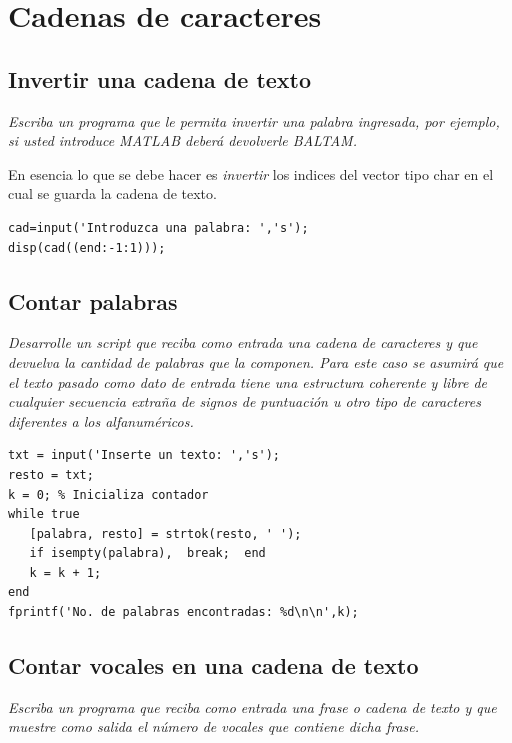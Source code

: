 \chapter{Cadenas de caracteres}

\section{Invertir una cadena de texto}

\textit{Escriba un programa que le permita invertir una palabra ingresada, por ejemplo, si usted 
introduce MATLAB deberá devolverle BALTAM.}



En esencia lo que se debe hacer es \textit{invertir} los indices del vector tipo char en 
el cual se guarda la cadena de texto.

\begin{verbatim}
cad=input('Introduzca una palabra: ','s');
disp(cad((end:-1:1)));
\end{verbatim}

\section{Contar palabras}

\textit{Desarrolle un script que reciba como entrada una cadena de caracteres y que devuelva 
la cantidad de palabras que la componen. Para este caso se asumirá que el texto pasado como dato 
de entrada tiene una estructura coherente y libre de cualquier secuencia extraña de signos de 
puntuación u otro tipo de caracteres diferentes a los alfanuméricos.}



\begin{verbatim}
txt = input('Inserte un texto: ','s');
resto = txt;
k = 0; % Inicializa contador
while true
   [palabra, resto] = strtok(resto, ' ');
   if isempty(palabra),  break;  end
   k = k + 1;
end
fprintf('No. de palabras encontradas: %d\n\n',k);
\end{verbatim}


\section{Contar vocales en una cadena de texto}

\textit{Escriba un programa que reciba como entrada una frase o cadena de texto y que muestre como salida el número de vocales que contiene dicha frase.}



